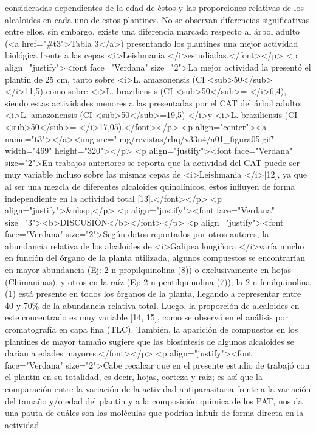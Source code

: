 consideradas dependientes de la edad de éstos y las proporciones relativas de
los alcaloides en cada uno de estos plantines. No se observan diferencias
significativas entre ellos, sin embargo, existe una diferencia marcada respecto
al árbol adulto (<a href="\#t3">Tabla 3</a>) presentando los plantines una mejor
actividad biológica frente a las cepas <i>Leishmania </i>estudiadas.</font></p>
<p align="justify"><font face="Verdana" size="2">La mejor actividad la presentó
el plantin de 25 cm, tanto sobre <i>L. amazonensis (CI <sub>50</sub>= </i>11,5)
como sobre <i>L. braziliensis (CI <sub>50</sub>= </i>6,4), siendo estas
actividades menores a las presentadas por el CAT del árbol adulto: <i>L.
amazonensis (CI <sub>50</sub>=19,5) </i>y <i>L. braziliensis (CI <sub>50</sub>=
</i>17,05).</font></p> <p align="center"><a name="t3"></a><img
src="img/revistas/rbq/v33n4/a01\_{}figura05.gif" width="469" height="320"></p>
<p align="justify"><font face="Verdana" size="2">En trabajos anteriores se
reporta que la actividad del CAT puede ser muy variable incluso sobre las mismas
cepas de <i>Leishmania </i>[12], ya que al ser una mezcla de diferentes
alcaloides quinolínicos, éstos influyen de forma independiente en la actividad
total [13].</font></p> <p align="justify">\&nbsp;</p> <p align="justify"><font
face="Verdana" size="3"><b>DISCUSIÓN</b></font></p> <p align="justify"><font
face="Verdana" size="2">Según datos reportados por otros autores, la abundancia
relativa de los alcaloides de <i>Galipea longiñora </i>varía mucho en función
del órgano de la planta utilizada, algunos compuestos se encontrarían en mayor
abundancia (Ej: 2-n-propilquinolina (8)) o exclusivamente en hojas (Chimaninas),
y otros en la raíz (Ej: 2-n-pentilquinolina (7)); la 2-n-fenilquinolina (1) está
presente en todos los órganos de la planta, llegando a representar entre 40 y
70\% de la abundancia relativa total. Luego, la proporción de alcaloides en este
concentrado es muy variable [14, 15], como se observó en el análisis por
cromatografía en capa fina (TLC). También, la aparición de compuestos en los
plantines de mayor tamaño sugiere que las biosíntesis de algunos alcaloides se
darían a edades mayores.</font></p> <p align="justify"><font face="Verdana"
size="2">Cabe recalcar que en el presente estudio de trabajó con el plantin en
su totalidad, es decir, hojas, corteza y raíz; es así que la comparación entre
la variación de la actividad antiparasitaria frente a la variación del tamaño
y/o edad del plantin y a la composición química de los PAT, nos da una pauta de
cuáles son las moléculas que podrían influir de forma directa en la actividad
